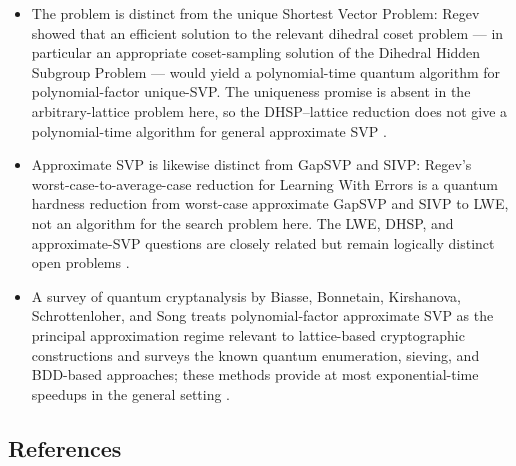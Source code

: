 \begin{itemize}
  \item The problem is distinct from the unique Shortest Vector Problem: Regev
showed that an efficient solution to the relevant dihedral coset problem
--- in particular an appropriate coset-sampling solution of the Dihedral
Hidden Subgroup Problem --- would yield a polynomial-time quantum algorithm
for polynomial-factor unique-SVP.  The uniqueness promise is absent in the
arbitrary-lattice problem here, so the DHSP--lattice reduction does not give
a polynomial-time algorithm for general approximate SVP
.

  \item Approximate SVP is likewise distinct from GapSVP and SIVP: Regev's
worst-case-to-average-case reduction for Learning With Errors is a quantum
hardness reduction from worst-case approximate GapSVP and SIVP to LWE, not
an algorithm for the search problem here.  The LWE, DHSP, and
approximate-SVP questions are closely related but remain logically distinct
open problems
.

  \item A survey of quantum cryptanalysis by Biasse, Bonnetain, Kirshanova,
Schrottenloher, and Song treats polynomial-factor approximate SVP as the
principal approximation regime relevant to lattice-based cryptographic
constructions and surveys the known quantum enumeration, sieving, and
BDD-based approaches; these methods provide at most exponential-time
speedups in the general setting
.
\end{itemize}

\subsection*{References}

